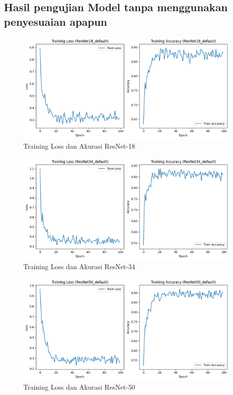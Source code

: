 \subsection{Hasil pengujian Model tanpa menggunakan penyesuaian apapun}
    \begin{figure}[H]
        \includegraphics[scale=0.8]{gambar/TrainingGraphResNet18.png}
        \caption{Training Loss dan Akurasi ResNet-18}
        \label{Img:GraphResNet18}
    \end{figure}
    \begin{figure}[H]
        \includegraphics[scale=0.8]{gambar/TrainingGraphResNet34.png}
        \caption{Training Loss dan Akurasi ResNet-34}
        \label{Img:GraphResNet34}
    \end{figure}
    \begin{figure}[H]
        \includegraphics[scale=0.8]{gambar/TrainingGraphResNet50.png}
        \caption{Training Loss dan Akurasi ResNet-50}
        \label{Img:GraphResNet50}
    \end{figure}
